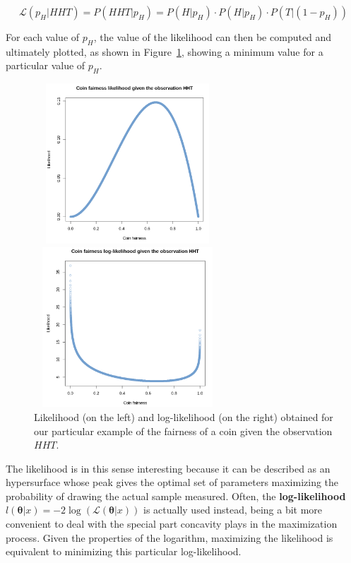 \documentclass[a4paper, 11pt]{report}
\begin{document}
\begin{equation}
\label{eq:likelihoodEx}
\mathcal{L}(p_H | HHT) = P(HHT | p_H) = P(H | p_H) \cdot P(H | p_H) \cdot P(T | (1-p_H))
\end{equation}

For each value of $p_H$, the value of the likelihood can then be computed and ultimately plotted, as shown in Figure~\ref{fig:likelihoodEx}, showing a minimum value for a particular value of $p_H$.

\begin{figure}[htbp]
\centering
\begin{minipage}[b]{.49\textwidth}
\includegraphics[width=7cm, height=6cm]{figs/likelihood.png}
\end{minipage}\hfill
\begin{minipage}[b]{.49\textwidth}
\includegraphics[width=7cm, height=6cm]{figs/loglikelihood.png}
\end{minipage} \hfill
\caption{Likelihood (on the left) and log-likelihood (on the right) obtained for our particular example of the fairness of a coin given the observation $HHT$.}
\label{fig:likelihoodEx}
\end{figure}

The likelihood is in this sense interesting because it can be described as an hypersurface whose peak gives the optimal set of parameters maximizing the probability of drawing the actual sample measured. Often, the \textbf{log-likelihood} $l(\bm \theta | x) = -2 \log(\mathcal{L}(\bm \theta | x))$ is actually used instead, being a bit more convenient to deal with the special part concavity plays in the maximization process. Given the properties of the logarithm, maximizing the likelihood is equivalent to minimizing this particular log-likelihood.
\end{document}
